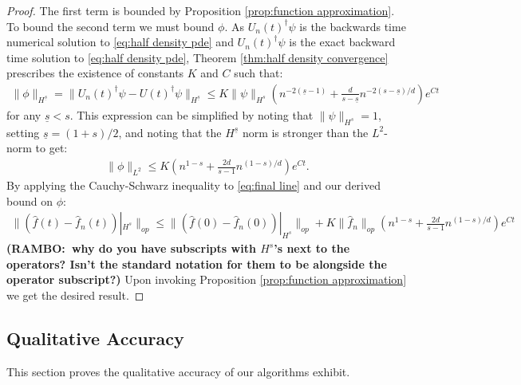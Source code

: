 \documentclass[final,leqno]{siamltex1213}
\newcommand{\ram}[1]{{\normalsize{\textbf{({\color{red}RAMBO:\ }#1)}}}}
\begin{document}
\begin{proof}
	The first term is bounded by Proposition \ref{prop:function approximation}.
	To bound the second term we must bound $\phi$.
	As $U_{n}(t)^{\dagger} \psi$ is the backwards time numerical solution to \eqref{eq:half density pde} and $U_{n}(t)^{\dagger}\psi$ is the exact backward time solution to \eqref{eq:half density pde}, Theorem \ref{thm:half density convergence} prescribes the existence of constants $K$ and $C$ such that:
	\begin{align}
		\| \phi \|_{H^{\underline{s}}} = \| U_{n}(t)^{\dagger} \psi - U(t)^{\dagger} \psi \|_{H^{\underline{s}}}  \leq K \| \psi \|_{H^{s}} \left(  n^{-2(\underline{s}-1)} + \frac{d}{s - \underline{s}} n^{-2(s-\underline{s})/d} \right) e^{Ct} 
	\end{align}
	for any $\underline{s} <s$.
	This expression can be simplified by noting that $\| \psi \|_{H^{s}} = 1$, setting $\underline{s} = (1+s)/2$, and noting that the $H^{\underline{s}}$ norm is stronger than the $L^{2}$-norm to get:
	\begin{align}
		 \| \phi \|_{L^{2}}  \leq  K \left(  n^{1-s} + \frac{2d}{s -1} n^{(1-s)/d} \right) e^{Ct}.
	\end{align}
	By applying the Cauchy-Schwarz inequality to \eqref{eq:final line} and our derived bound on $\phi$:
	\begin{align}
		\| ( \hat{f}(t) - \hat{f}_{n}(t))|_{H^{s}} \|_{op} \leq \| ( \hat{f}(0) - \hat{f}_{n}(0) )|_{H^{s}} \|_{op} +  K \| \hat{f}_{n} \|_{op} \left( n^{1-s} + \frac{2d}{s -1} n^{(1-s)/d} \right) e^{Ct}
	\end{align}
	\ram{why do you have subscripts with $H^{s}$'s next to the operators? Isn't the standard notation for them to be alongside the operator subscript?}
	Upon invoking Proposition \ref{prop:function approximation} we get the desired result.
\end{proof}


\subsection{Qualitative Accuracy}
This section proves the qualitative accuracy of our algorithms exhibit.
\end{document}
